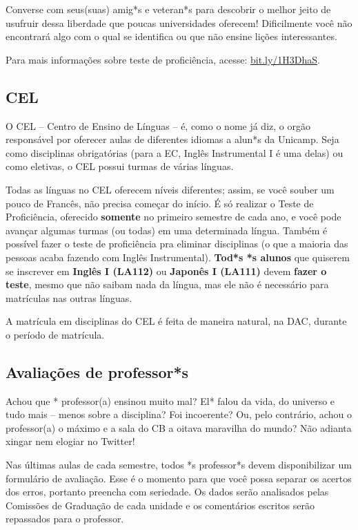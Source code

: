 Converse com seus(suas) amig*s e veteran*s para descobrir o melhor jeito de
usufruir dessa liberdade que poucas universidades oferecem! Dificilmente você
não encontrará algo com o qual se identifica ou que não ensine lições
interessantes.

Para mais informações sobre teste de proficiência, acesse:
\url{bit.ly/1H3DhaS}.

\subsection{CEL}

O CEL – Centro de Ensino de Línguas – é, como o nome já diz, o orgão
responsável por oferecer aulas de diferentes idiomas a alun*s da Unicamp. Seja
como disciplinas obrigatórias (para a EC, Inglês Instrumental I é uma delas) ou
como eletivas, o CEL possui turmas de várias línguas.

Todas as línguas no CEL oferecem níveis diferentes; assim, se você souber um
pouco de Francês, não precisa começar do início. É só realizar o Teste de
Proficiência, oferecido \textbf{somente} no primeiro semestre de cada ano, e
você pode avançar algumas turmas (ou todas) em uma determinada língua. Também é
possível fazer o teste de proficiência pra eliminar disciplinas (o que a
maioria das pessoas acaba fazendo com Inglês Instrumental).
\textbf{Tod*s *s alunos} que quiserem se inscrever em \textbf{Inglês I (LA112)}
ou \textbf{Japonês I (LA111)} devem \textbf{fazer o teste}, mesmo que não
saibam nada da língua, mas ele não é necessário para matrículas nas outras
línguas.

A matrícula em disciplinas do CEL é feita de maneira natural, na DAC, durante o
período de matrícula.

\subsection{Avaliações de professor*s}

Achou que * professor(a) ensinou muito mal? El* falou da vida, do universo e
tudo mais -- menos sobre a disciplina? Foi incoerente? Ou, pelo contrário,
achou o professor(a) o máximo e a sala do CB a oitava maravilha do mundo? Não
adianta xingar nem elogiar no Twitter!

Nas últimas aulas de cada semestre, todos *s professor*s devem disponibilizar
um formulário de avaliação. Esse é o momento para que você possa separar os
acertos dos erros, portanto preencha com seriedade. Os dados serão analisados
pelas Comissões de Graduação de cada unidade e os comentários escritos serão
repassados para o professor.

